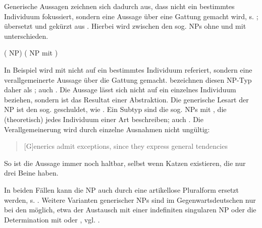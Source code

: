 
Generische Aussagen zeichnen sich dadurch aus, dass nicht ein bestimmtes Individuum fokussiert, sondern eine Aussage über eine Gattung gemacht wird, s. ; übersetzt und gekürzt aus \textcite[]{Krifka1995}. Hierbei wird zwischen den sog.  NPs ohne und mit  unterschieden.   

\begin{exe}
	\ex \label{ex:gener}   
	\begin{xlist}
		\ex \label{ex:sued}  ( NP)
		\ex \label{ex:vitc}  ( NP mit )
		\end{xlist}
\end{exe}

In Beispiel  wird mit  nicht auf ein bestimmtes Individuum referiert, sondern eine verallgemeinerte Aussage über die Gattung  gemacht. \textcite[2]{Krifka1995} bezeichnen diesen NP-Typ daher als ; auch  \parencite[138]{Bisle-Muller1991}. Die Aussage lässt sich nicht auf ein einzelnes Individuum beziehen, sondern ist das Resultat einer Abstraktion. Die generische Lesart der NP ist den sog.  geschuldet, wie  \parencite{Krifka1995}. Ein Subtyp sind die sog.  NPs mit , die (theoretisch) jedes Individuum einer Art beschreiben; auch   \parencite[139-140]{Bisle-Muller1991}. Die Verallgemeinerung wird durch einzelne Ausnahmen nicht ungültig: \blockcquote[179]{Lyons1999}{[G]enerics admit exceptions, since they express general tendencies}. So ist die Aussage   immer noch haltbar, selbst wenn Katzen existieren, die nur drei Beine haben.

In beiden Fällen kann die NP auch durch eine artikellose Pluralform ersetzt werden, s. . 
Weitere Varianten generischer NPs sind im Gegenwartsdeutschen nur bei den  möglich, etwa der Austausch mit einer indefiniten singularen NP oder die Determination mit  oder  \parencite[296]{Duden2009}, vgl. . 

